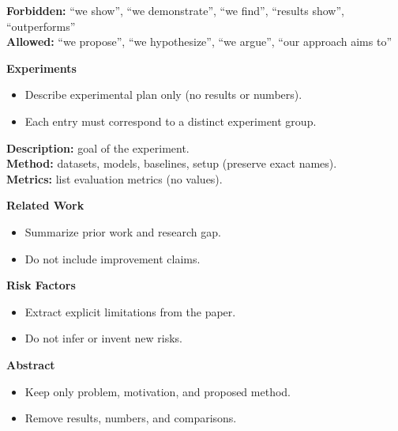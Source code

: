 \begin{tcolorbox}[title=\textbf{System Prompt to Extract Proposal}]
\textbf{Forbidden:} ``we show'', ``we demonstrate'', ``we find'', ``results show'', ``outperforms'' \\
\textbf{Allowed:} ``we propose'', ``we hypothesize'', ``we argue'', ``our approach aims to''

\vspace{0.3em}
\textbf{Experiments}
\begin{itemize}
\item Describe experimental plan only (no results or numbers).
\item Each entry must correspond to a distinct experiment group.
\end{itemize}

\textbf{Description:} goal of the experiment. \\
\textbf{Method:} datasets, models, baselines, setup (preserve exact names). \\
\textbf{Metrics:} list evaluation metrics (no values).

\vspace{0.3em}
\textbf{Related Work}
\begin{itemize}
\item Summarize prior work and research gap.
\item Do not include improvement claims.
\end{itemize}

\vspace{0.3em}
\textbf{Risk Factors}
\begin{itemize}
\item Extract explicit limitations from the paper.
\item Do not infer or invent new risks.
\end{itemize}

\vspace{0.3em}
\textbf{Abstract}
\begin{itemize}
\item Keep only problem, motivation, and proposed method.
\item Remove results, numbers, and comparisons.
\end{itemize}

\end{tcolorbox}

